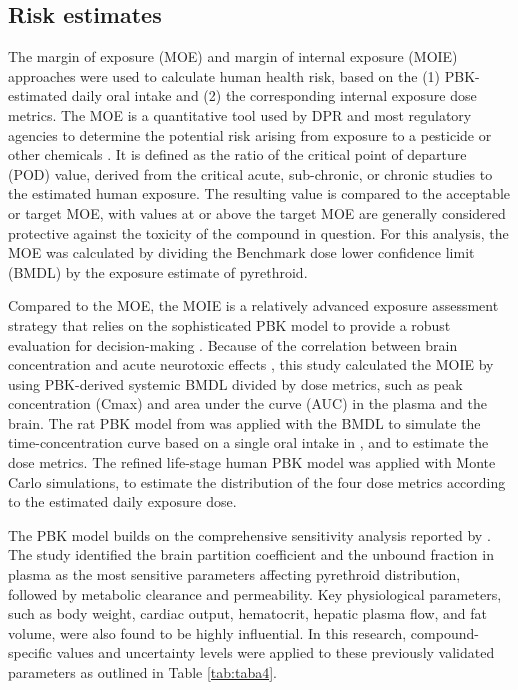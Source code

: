 \documentclass[toxics,article,submit,pdftex,moreauthors]{Definitions/mdpi}
\begin{document}
\subsection{Risk estimates}\label{risk-estimates}

The margin of exposure (MOE) and margin of internal exposure (MOIE) approaches
were used to calculate human health risk, based on the (1) PBK-estimated daily
oral intake and (2) the corresponding internal exposure dose metrics. The MOE
is a quantitative tool used by DPR and most regulatory agencies to determine
the potential risk arising from exposure to a pesticide or other chemicals
\citep{beaudouin2010stochastic, beauvais_human_2010}. It is defined as the
ratio of the critical point of departure (POD) value, derived from the critical
acute, sub-chronic, or chronic studies to the estimated human exposure. The
resulting value is compared to the acceptable or target MOE, with values at or
above the target MOE are generally considered protective against the toxicity
of the compound in question. For this analysis, the MOE was calculated by
dividing the Benchmark dose lower confidence limit (BMDL) by the exposure
estimate of pyrethroid.

Compared to the MOE, the MOIE is a relatively advanced exposure assessment
strategy that relies on the sophisticated PBK model to provide a robust
evaluation for decision-making \citep{bessems_margin_2017}. Because of the
correlation between brain concentration and acute neurotoxic effects
\citep{scollon_correlation_2011}, this study calculated the MOIE by using PBK-derived
systemic BMDL divided by dose metrics, such as peak concentration (Cmax) and
area under the curve (AUC) in the plasma and the brain. The rat PBK model from
\citet{song2019evaluation} was applied with the BMDL to simulate the
time-concentration curve based on a single oral intake in
\citet{wolansky_relative_2006}, and to estimate the dose metrics. The refined
life-stage human PBK model was applied with Monte Carlo simulations, to
estimate the distribution of the four dose metrics according to the estimated
daily exposure dose. 

The PBK model builds on the comprehensive sensitivity analysis reported by
\citet{mallick2020development}. The study identified the brain partition
coefficient and the unbound fraction in plasma as the most sensitive parameters
affecting pyrethroid distribution, followed by metabolic clearance and
permeability. Key physiological parameters, such as body weight, cardiac
output, hematocrit, hepatic plasma flow, and fat volume, were also found to be
highly influential. In this research, compound-specific values and uncertainty 
levels were applied to these previously validated parameters as
outlined in Table \ref{tab:taba4}.
\end{document}
